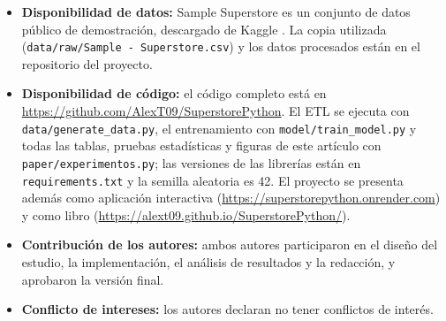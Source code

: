 \documentclass[pdflatex,sn-mathphys-num]{sn-jnl}
\begin{document}
\begin{itemize}
\item \textbf{Disponibilidad de datos:} Sample Superstore es un conjunto de datos público de demostración, descargado de Kaggle \cite{superstore}. La copia utilizada (\texttt{data/raw/Sample - Superstore.csv}) y los datos procesados están en el repositorio del proyecto.
\item \textbf{Disponibilidad de código:} el código completo está en \url{https://github.com/AlexT09/SuperstorePython}. El ETL se ejecuta con \texttt{data/generate\_data.py}, el entrenamiento con \texttt{model/train\_model.py} y todas las tablas, pruebas estadísticas y figuras de este artículo con \texttt{paper/experimentos.py}; las versiones de las librerías están en \texttt{requirements.txt} y la semilla aleatoria es 42. El proyecto se presenta además como aplicación interactiva (\url{https://superstorepython.onrender.com}) y como libro (\url{https://alext09.github.io/SuperstorePython/}).
\item \textbf{Contribución de los autores:} ambos autores participaron en el diseño del estudio, la implementación, el análisis de resultados y la redacción, y aprobaron la versión final.
\item \textbf{Conflicto de intereses:} los autores declaran no tener conflictos de interés.
\end{itemize}


\end{document}
